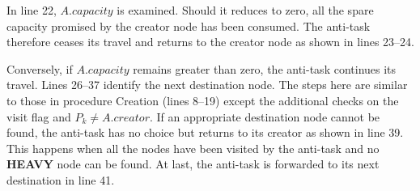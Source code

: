 %
%
In line 22, $A.capacity$ is examined.
Should it reduces to zero, all the spare capacity promised
by the creator node has been consumed.
The anti-task therefore ceases its travel and returns
to the creator node as shown in lines 23--24.




%
%
Conversely, if $A.capacity$ remains greater than zero,
the anti-task continues its travel.
Lines 26--37 identify the next destination node.
The steps here are similar to those
in procedure {\sc Creation} (lines 8--19)
except the additional checks on the visit flag and $P_k \neq A.creator$.
If an appropriate destination node cannot be found, the anti-task
has no choice but returns to its creator as shown in line 39.
This happens when all the nodes have been visited
by the anti-task and no {\bf HEAVY} node can be found.
%
At last, the anti-task is forwarded to its next destination in line 41.




